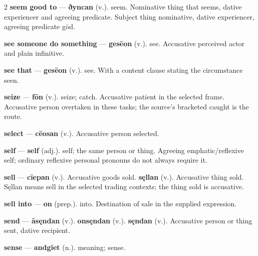 \begin{multicols}{2}
\textbf{seem good to} — \textbf{ðyncan} (v.). seem. Nominative thing that seems, dative experiencer and agreeing predicate. Subject thing nominative, dative experiencer, agreeing predicate gōd.\par
\textbf{see someone do something} — \textbf{gesēon} (v.). see. Accusative perceived actor and plain infinitive.\par
\textbf{see that} — \textbf{gesēon} (v.). see. With a content clause stating the circumstance seen.\par
\textbf{seize} — \textbf{fōn} (v.). seize; catch. Accusative patient in the selected frame. Accusative person overtaken in these tasks; the source's bracketed caught is the route.\par
\textbf{select} — \textbf{cēosan} (v.). Accusative person selected.\par
\textbf{self} — \textbf{self} (adj.). self; the same person or thing. Agreeing emphatic/reflexive self; ordinary reflexive personal pronouns do not always require it.\par
\textbf{sell} — \textbf{cīepan} (v.). Accusative goods sold. \textbf{sęllan} (v.). Accusative thing sold. Sęllan means sell in the selected trading contexts; the thing sold is accusative.\par
\textbf{sell into} — \textbf{on} (prep.). into. Destination of sale in the supplied expression.\par
\textbf{send} — \textbf{āsęndan} (v.).  \textbf{onsęndan} (v.).  \textbf{sęndan} (v.). Accusative person or thing sent, dative recipient.\par
\textbf{sense} — \textbf{andgiet} (n.). meaning; sense.\par

\end{multicols}
